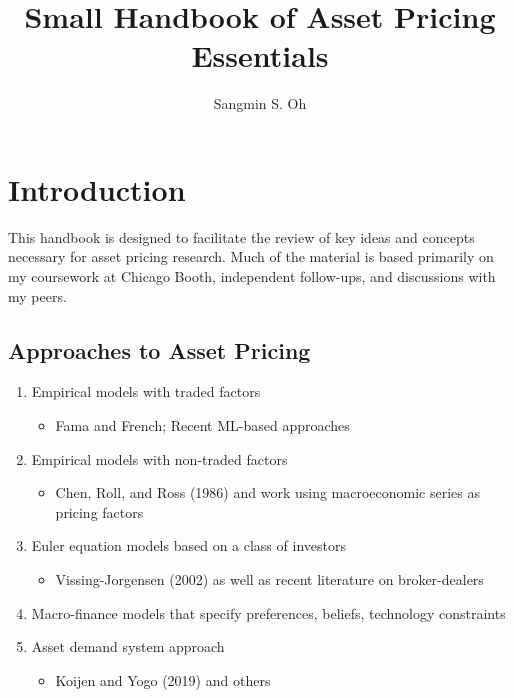 \documentclass[
]{book}
\title{Small Handbook of Asset Pricing Essentials}
\author{Sangmin S. Oh}
\date{}
\providecommand{\tightlist}{%
  \setlength{\itemsep}{0pt}\setlength{\parskip}{0pt}}
\begin{document}
\maketitle

{
\setcounter{tocdepth}{1}
\tableofcontents
}
\hypertarget{introduction}{%
\chapter{Introduction}\label{introduction}}

This handbook is designed to facilitate the review of key ideas and concepts necessary for asset pricing research. Much of the material is based primarily on my coursework at Chicago Booth, independent follow-ups, and discussions with my peers.

\hypertarget{approaches-to-asset-pricing}{%
\section{Approaches to Asset Pricing}\label{approaches-to-asset-pricing}}

\begin{enumerate}
\def\labelenumi{\arabic{enumi}.}
\tightlist
\item
  Empirical models with traded factors

  \begin{itemize}
  \tightlist
  \item
    Fama and French; Recent ML-based approaches
  \end{itemize}
\item
  Empirical models with non-traded factors

  \begin{itemize}
  \tightlist
  \item
    Chen, Roll, and Ross (1986) and work using macroeconomic series as pricing factors
  \end{itemize}
\item
  Euler equation models based on a class of investors

  \begin{itemize}
  \tightlist
  \item
    Vissing-Jorgensen (2002) as well as recent literature on broker-dealers
  \end{itemize}
\item
  Macro-finance models that specify preferences, beliefs, technology constraints
\item
  Asset demand system approach

  \begin{itemize}
  \tightlist
  \item
    Koijen and Yogo (2019) and others
  \end{itemize}
\end{enumerate}
\end{document}
